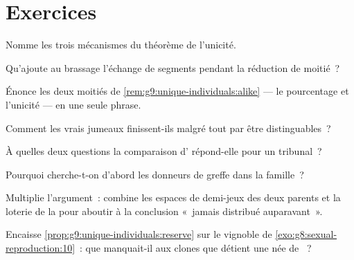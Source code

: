 \section{Exercices}

\begin{exercise}[$\star$]\label{exo:g9:unique-individuals:1}
Nomme les trois mécanismes du théorème de l'unicité.
\end{exercise}

\begin{exercise}[$\star$]\label{exo:g9:unique-individuals:2}
Qu'ajoute au brassage l'échange de segments pendant la
réduction de moitié~?
\end{exercise}

\begin{exercise}[$\star$]\label{exo:g9:unique-individuals:3}
Énonce les deux moitiés de
\cref{rem:g9:unique-individuals:alike} --- le pourcentage et
l'unicité --- en une seule phrase.
\end{exercise}

\begin{exercise}[$\star$]\label{exo:g9:unique-individuals:4}
Comment les vrais jumeaux finissent-ils malgré tout par
être distinguables~?
\end{exercise}

\begin{exercise}[$\star$]\label{exo:g9:unique-individuals:5}
À quelles deux questions la comparaison d' répond-elle
pour un tribunal~?
\end{exercise}

\begin{exercise}[$\star$]\label{exo:g9:unique-individuals:6}
Pourquoi cherche-t-on d'abord les donneurs de greffe dans
la famille~?
\end{exercise}

\begin{exercise}[$\star\star$]\label{exo:g9:unique-individuals:7}
Multiplie l'argument~: combine les espaces de demi-jeux des
deux parents et la loterie de la  pour aboutir à
la conclusion «~jamais distribué auparavant~».
\end{exercise}

\begin{exercise}[$\star\star$]\label{exo:g9:unique-individuals:8}
Encaisse \cref{prop:g9:unique-individuals:reserve} sur le
vignoble de \cref{exo:g8:sexual-reproduction:10}~: que
manquait-il aux clones que détient une  née de
~?
\end{exercise}

